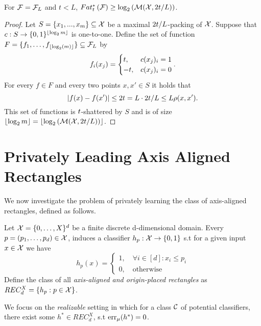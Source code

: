 \documentclass[12pt,a4paper,oneside,onecolumn]{book}
\begin{document}
\begin{lemma}
  For $\mathcal{F}=\mathcal{F}_L$ and $t<L$,
  $Fat^*_{t}\left(\mathcal{F}\right)  \geq \log_2\left(\mathcal{M}(\mathcal{X},2t/L)\right)$.
\end{lemma}
\begin{proof}
  Let $S=\{x_1,...,x_m\} \subseteq \mathcal{X}$
  be a maximal
  $2t/L$-packing
of $\mathcal{X}$.
Suppose that
$c: S \to \{0,1\}^{\left\lfloor\log_2m\right\rfloor}$
is one-to-one.
Define the set of function $F = \{f_1,\ldots,f_{\left\lfloor\log_2(m)\right\rfloor}\} \subseteq \mathcal{F}_L$ by
  \[
    f_i(x_j) =
    \begin{cases}
      t, & c(x_j)_i = 1 \\
      -t, & c(x_j)_i = 0
    \end{cases}.
  \]
  For every $f \in F$ and every two points $x,x' \in S$ it holds that
  \[\lvert f(x) - f(x')\rvert \leq 2t = L \cdot 2t / L \leq L  \rho(x,x').\]
  This set of functions is $t$-shattered by $S$
  and is of size
  $\left\lfloor\log_2m\right\rfloor = \left\lfloor\log_2\left(\mathcal{M}(\mathcal{X},2t/L)\right)\right\rfloor$.
\end{proof}


    

\chapter{Privately Leading Axis Aligned Rectangles}

We now investigate the problem of privately learning the class of axis-aligned rectangles, defined as follows.

\begin{definition}
Let $\mathcal{X}=\{0,\ldots,X\}^d$ be a finite discrete d-dimensional domain.
Every $p = (p_1,\ldots,p_d) \in \mathcal{X}$,
induces a classifier $h_p:\mathcal{X}\to\{0,1\}$ s.t 
for a given input $x \in \mathcal{X}$ we have 
$$h_p (x) = 
\begin{cases}
1,\quad \forall i\in [d]: x_i \leq p_i\\
0,\quad \text{otherwise}
\end{cases}
$$ 
Define the class of all \emph{axis-aligned and origin-placed rectangles} as $REC^X_d = \{h_p : p\in\mathcal{X}\}$.
\end{definition}
We focus on the \emph{realizable} setting in which 
for a class $\mathcal{C}$ of potential classifiers,
there exist some $h^* \in REC^X_d$,
s.t $\mathrm{err}_{\mu}(h^*) = 0$.
\end{document}
